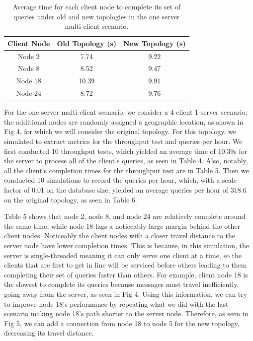 \begin{table}[h!]
\centering
\begin{tabular}{|c|c|c|}
\hline
Client Node & Old Topology (s) & New Topology (s) \\ \hline
Node 2 & 7.74 & 9.22  \\ \hline
Node 8 & 8.52 & 9.47 \\ \hline
Node 18 & 10.39 & 9.91 \\ \hline
Node 24 & 8.72 & 9.76 \\ \hline
\end{tabular}
\caption{Average time for each client node to complete its set of queries under old and new topologies in the one server multi-client scenario.}
\label{tab:avg_time_per_node}
\end{table}


For the one server multi-client scenario, we consider a 4-client 1-server scenario; the additional nodes are randomly assigned a geographic location, as shown in Fig 4, for which we will consider the original topology. For this topology, we simulated to extract metrics for the throughput test and queries per hour. We first conducted 10 throughput tests, which yielded an average time of 10.39s for the server to process all of the client's queries, as seen in Table 4.  Also, notably, all the client's completion times for the throughput test are in Table 5. Then we conducted 10 simulations to record the queries per hour, which, with a scale factor of 0.01 on the database size, yielded an average queries per hour of 318.6 on the original topology, as seen in Table 6.
	
	Table 5 shows that node 2, node 8, and node 24 are relatively complete around the same time, while node 18 lags a noticeably large margin behind the other client nodes. Noticeably the client nodes with a closer travel distance to the server node have lower completion times. This is because, in this simulation, the server is single-threaded meaning it can only serve one client at a time, so the clients that are first to get in line will be serviced before others leading to them completing their set of queries faster than others. For example, client node 18 is the slowest to complete its queries because messages must travel inefficiently, going away from the server, as seen in Fig 4. Using this information, we can try to improve node 18’s performance by repeating what we did with the last scenario making node 18’s path shorter to the server node. Therefore, as seen in Fig 5, we can add a connection from node 18 to node 5 for the new topology, decreasing its travel distance.

